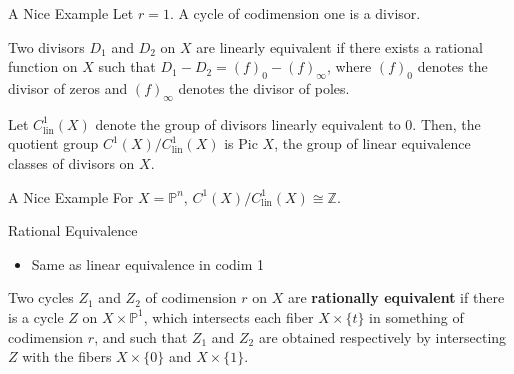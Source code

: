 \begin{frame}{A Nice Example}
  Let $r=1$. A cycle of codimension one is a divisor. 
  \begin{definition}
    Two divisors $D_1$ and $D_2$ on $X$ are linearly equivalent if there exists a rational function on $X$ such that
    $D_1 - D_2 = (f)_0 - (f)_\infty$, where $(f)_0$ denotes the divisor of zeros and $(f)_\infty$ denotes the
    divisor of poles. 
  \end{definition}\pause

  \begin{example}
    Let $C^1_{\text{lin}}(X)$ denote the group of divisors linearly equivalent to 0. Then, the quotient group 
    $C^1(X) / C^1_{\text{lin}}(X)$ is $\text{Pic } X$, the group of linear equivalence classes of divisors on $X$.
  \end{example}
\end{frame}

\begin{frame}{A Nice Example}
  For $X = \mathbb{P}^n$, $C^1(X) / C^1_{\text{lin}}(X) \cong \mathbb{Z}$.
\end{frame}

\begin{frame}{Rational Equivalence}
  \begin{itemize}
    \item Same as linear equivalence in codim 1 \pause
  \end{itemize}
  \begin{definition}
    Two cycles $Z_1$ and $Z_2$ of codimension $r$ on $X$ are \textbf{rationally equivalent} if there is a cycle
    $Z$ on $X \times \mathbb{P}^1$, which intersects each fiber $X \times \{t\}$ in something of codimension $r$, and
    such that $Z_1$ and $Z_2$ are obtained respectively by intersecting $Z$ with the fibers $X\times\{0\}$ 
    and $X\times\{1\}$.
  \end{definition}
\end{frame}

